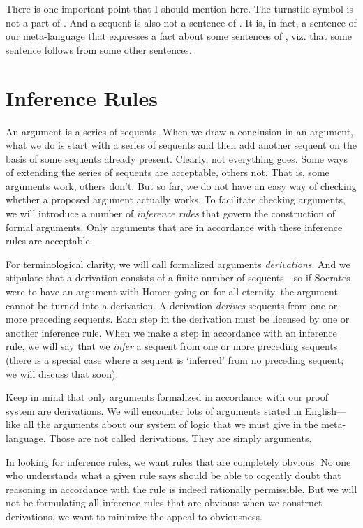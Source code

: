 There is one important point that I should mention here. The turnstile symbol 
\p{\lproves} is not a part of \lL{}.  And a sequent is also not a sentence of 
\lL[]. It is, in fact, a sentence of our meta-language that expresses a fact 
about some sentences of \lL[], viz. that some sentence follows from some other 
sentences.  










\section{Inference Rules}\label{sec:inference-rules}

An argument is a series of sequents. When we draw a conclusion in an argument, 
what we do is start with a series of sequents and then add another sequent on 
the basis of some sequents already present. Clearly, not everything goes.  Some 
ways of extending the series of sequents are acceptable, others not. That is, 
some arguments work, others don't. But so far, we do not have an easy way of 
checking whether a proposed argument actually works. To facilitate checking 
arguments, we will introduce a number of \emph{inference rules} that govern the 
construction of formal arguments. Only arguments that are in accordance with 
these inference rules are acceptable.


For terminological clarity, we will call formalized arguments   
\emph{derivations}. And we stipulate that a derivation consists of a finite 
number of sequents---so if Socrates were to have an argument with Homer going on 
for all eternity, the argument cannot be turned into a derivation. A derivation 
\emph{derives} sequents from one or more preceding sequents.  Each step in the 
derivation must be licensed by one or another inference rule.  When we make a 
step in accordance with an inference rule, we will say that we \emph{infer} a 
sequent from one or more preceding sequents (there is a special case where a 
sequent is `inferred' from no preceding sequent;
 we will discuss that soon).  

Keep in mind that only arguments formalized in accordance with our proof system 
are derivations. We will encounter lots of arguments stated in English---like 
all the arguments about our system of logic that we must give in the 
meta-language.  Those are not called derivations.  They are simply arguments. 

In looking for inference rules, we want rules that are completely obvious. No 
one who understands what a given rule says should be able to cogently doubt that 
reasoning in accordance with the rule is indeed rationally permissible. But we 
will not be formulating all inference rules that are obvious:  when we construct 
derivations, we want to minimize the appeal to obviousness.


